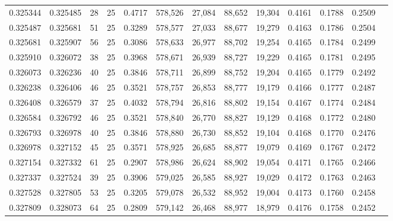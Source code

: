 \begin{tabular}{rrrrrrrrrrrrr}
0.325344 & 0.325485 &    28 &  25 &                                     0.4717 & 578,526 &  27,084 &  88,652 &  19,304 & 0.4161 & 0.1788 & 0.2509 \\
0.325487 & 0.325681 &    51 &  25 &                                     0.3289 & 578,577 &  27,033 &  88,677 &  19,279 & 0.4163 & 0.1786 & 0.2504 \\
0.325681 & 0.325907 &    56 &  25 &                                     0.3086 & 578,633 &  26,977 &  88,702 &  19,254 & 0.4165 & 0.1784 & 0.2499 \\
0.325910 & 0.326072 &    38 &  25 &                                     0.3968 & 578,671 &  26,939 &  88,727 &  19,229 & 0.4165 & 0.1781 & 0.2495 \\
0.326073 & 0.326236 &    40 &  25 &                                     0.3846 & 578,711 &  26,899 &  88,752 &  19,204 & 0.4165 & 0.1779 & 0.2492 \\
0.326238 & 0.326406 &    46 &  25 &                                     0.3521 & 578,757 &  26,853 &  88,777 &  19,179 & 0.4166 & 0.1777 & 0.2487 \\
0.326408 & 0.326579 &    37 &  25 &                                     0.4032 & 578,794 &  26,816 &  88,802 &  19,154 & 0.4167 & 0.1774 & 0.2484 \\
0.326584 & 0.326792 &    46 &  25 &                                     0.3521 & 578,840 &  26,770 &  88,827 &  19,129 & 0.4168 & 0.1772 & 0.2480 \\
0.326793 & 0.326978 &    40 &  25 &                                     0.3846 & 578,880 &  26,730 &  88,852 &  19,104 & 0.4168 & 0.1770 & 0.2476 \\
0.326978 & 0.327152 &    45 &  25 &                                     0.3571 & 578,925 &  26,685 &  88,877 &  19,079 & 0.4169 & 0.1767 & 0.2472 \\
0.327154 & 0.327332 &    61 &  25 &                                     0.2907 & 578,986 &  26,624 &  88,902 &  19,054 & 0.4171 & 0.1765 & 0.2466 \\
0.327337 & 0.327524 &    39 &  25 &                                     0.3906 & 579,025 &  26,585 &  88,927 &  19,029 & 0.4172 & 0.1763 & 0.2463 \\
0.327528 & 0.327805 &    53 &  25 &                                     0.3205 & 579,078 &  26,532 &  88,952 &  19,004 & 0.4173 & 0.1760 & 0.2458 \\
0.327809 & 0.328073 &    64 &  25 &                                     0.2809 & 579,142 &  26,468 &  88,977 &  18,979 & 0.4176 & 0.1758 & 0.2452 \\

\end{tabular}
